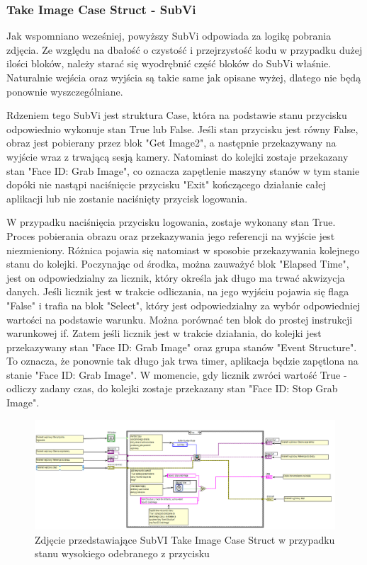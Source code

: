 \documentclass{report}
\begin{document}
\subsubsection*{Take Image Case Struct - SubVi}

Jak wspomniano wcześniej, powyższy SubVi odpowiada za logikę pobrania zdjęcia. Ze względu na dbałość o czystość i przejrzystość kodu w przypadku dużej ilości bloków, należy starać się wyodrębnić część bloków do SubVi właśnie. Naturalnie wejścia oraz wyjścia są takie same jak opisane wyżej, dlatego nie będą ponownie wyszczególniane. 

Rdzeniem tego SubVi jest struktura Case, która na podstawie stanu przycisku odpowiednio wykonuje stan True lub False. 
Jeśli stan przycisku jest równy False, obraz jest pobierany przez blok "Get Image2", a następnie przekazywany na wyjście wraz z trwającą sesją kamery. Natomiast do kolejki zostaje przekazany stan "Face ID: Grab Image", co oznacza zapętlenie maszyny stanów w tym stanie dopóki nie nastąpi naciśnięcie przycisku "Exit" kończącego działanie całej aplikacji lub nie zostanie naciśnięty przycisk logowania. 

W przypadku naciśnięcia przycisku logowania, zostaje wykonany stan True. Proces pobierania obrazu oraz przekazywania jego referencji na wyjście jest niezmieniony. Różnica pojawia się natomiast w sposobie przekazywania kolejnego stanu do kolejki. Poczynając od środka, można zauważyć blok "Elapsed Time", jest on odpowiedzialny za licznik, który określa jak długo ma trwać akwizycja danych. Jeśli licznik jest w trakcie odliczania, na jego wyjściu pojawia się flaga "False" i trafia na blok "Select", który jest odpowiedzialny za wybór odpowiedniej wartości na podstawie warunku. Można porównać ten blok do prostej instrukcji warunkowej if. Zatem jeśli licznik jest w trakcie działania, do kolejki jest przekazywany stan "Face ID: Grab Image" oraz grupa stanów "Event Structure". To oznacza, że ponownie tak długo jak trwa timer, aplikacja będzie zapętlona na stanie "Face ID: Grab Image". W momencie, gdy licznik zwróci wartość True - odliczy zadany czas, do kolejki zostaje przekazany stan "Face ID: Stop Grab Image". 

\begin{figure}[H]
    \centering
    \includegraphics[width=1.0\textwidth]{src/face-id/face-id-case.png}
    \caption{Zdjęcie przedstawiające SubVI Take Image Case Struct w przypadku stanu wysokiego odebranego z przycisku}
    \label{fig:face_id-grab-case}
\end{figure}
\end{document}
